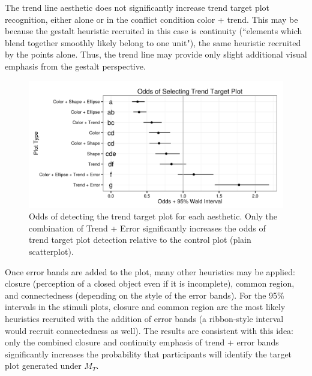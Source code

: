 \documentclass[11pt]{isuthesis}\usepackage[]{graphicx}\usepackage[]{color}
\newenvironment{knitrout}{}{} %
\begin{document}
The trend line aesthetic does not significantly increase trend target plot recognition, either alone or in the conflict condition color + trend. This may be because the gestalt heuristic recruited in this case is continuity (``elements which blend together smoothly likely belong to one unit"), the same heuristic recruited by the points alone. Thus, the trend line may provide only slight additional visual emphasis from the gestalt perspective.

\begin{figure}[htbp]\centering
\begin{knitrout}
\color{fgcolor}

{\centering \includegraphics[width=.75\linewidth]{Figure/FeatureHierarchy/fig-line-fixef-1} 

}



\end{knitrout}
\caption[Odds of detecting the trend target plot for each aesthetic]{Odds of detecting the trend target plot for each aesthetic. Only the combination of Trend + Error significantly increases the odds of trend target plot detection relative to the control plot (plain scatterplot). \label{fig:linear.fixef}}
\end{figure}

Once error bands are added to the plot, many other heuristics may be applied: closure (perception of a closed object even if it is incomplete), common region, and connectedness (depending on the style of the error bands). For the 95\% intervals in the stimuli plots, closure and common region are the most likely heuristics recruited with the addition of error bands (a ribbon-style interval would recruit connectedness as well). The results are consistent with this idea: only the combined closure and continuity emphasis of trend + error bands significantly increases the probability that participants will identify the target plot generated under $M_T$. 
\end{document}
